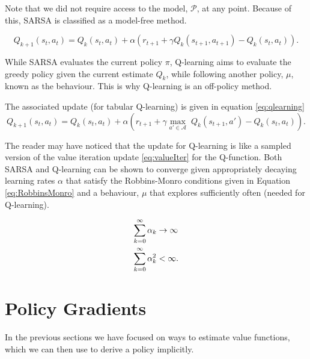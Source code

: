 \documentclass{report}
\numberwithin{equation}{section}
\numberwithin{figure}{section}
\numberwithin{table}{section}
\numberwithin{algorithm}{section}
\begin{document}
Note that we did not require access to the model, $\mathcal{P}$, at 
any point. Because of this, SARSA is classified as a model-free method.

\begin{equation}\label{eq:sarsa}
  Q_{k+1}(s_t, a_t) = Q_{k}(s_t, a_t) + \alpha (r_{t+1} + \gamma Q_{k}(s_{t+1}, a_{t+1}) - Q_{k}(s_t, a_t)).
\end{equation}


While SARSA evaluates the current policy $\pi$, Q-learning aims 
to evaluate the greedy policy given the current estimate $Q_{k}$, 
while following another policy, $\mu$, known as the behaviour. 
This is why Q-learning is an off-policy method.

The associated update (for tabular Q-learning) is given in equation 
\ref{eq:qlearning}
\begin{equation}\label{eq:qlearning}
  Q_{k+1}(s_t, a_t) = Q_{k}(s_t, a_t) + \alpha \left(r_{t+1} + \gamma \max_{a'\in\mathcal{A}}\;Q_{k}(s_{t+1}, a') - Q_{k}(s_t, a_t)\right).
\end{equation}

The reader may have noticed that the update for Q-learning is like 
a sampled version of the value iteration update \ref{eq:valueIter} 
for the Q-function. Both SARSA and Q-learning can be shown to 
converge given appropriately decaying learning rates $\alpha$ 
that satisfy the Robbins-Monro conditions given in Equation 
\ref{eq:RobbinsMonro} and a behaviour, $\mu$ that explores 
sufficiently often (needed for Q-learning).

\begin{align}\label{eq:RobbinsMonro}
  \sum_{k=0}^\infty \alpha_k&\rightarrow \infty\notag\\
  \sum_{k=0}^\infty \alpha_k^2&< \infty.
\end{align}

\section{Policy Gradients}\label{sec:PolicyGrads}
In the previous sections we have focused on ways to estimate 
value functions, which we can then use to derive a policy implicitly. 
\end{document}
